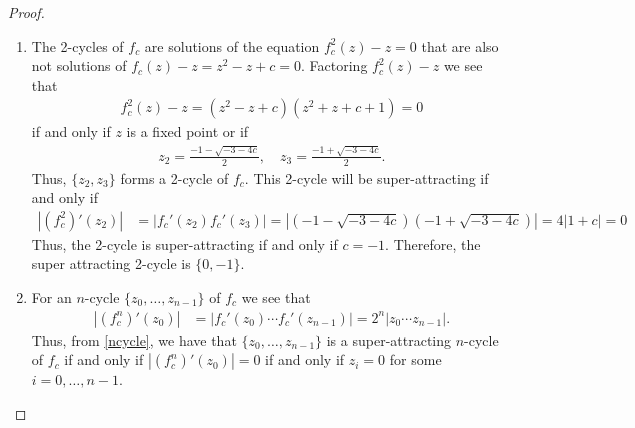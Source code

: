 \begin{proof}
\begin{enumerate}
    \item The 2-cycles of $f_c$ are solutions of the equation
      $f_c^2(z) - z =0$ that are also not solutions of $f_c(z) - z = z^2-z + c = 0$. Factoring $f_c^2(z) - z$
      we see that
      \begin{align*}
        f_c^2(z) - z = (z^2 -z + c)(z^2 + z + c + 1) = 0
      \end{align*}
      if and only if $z$ is a fixed point or if
      \begin{align*}
        z_2 = \frac{-1 - \sqrt{-3 - 4 c}}{2}, \quad        z_3 = \frac{-1 + \sqrt{-3 - 4 c}}{2}.
      \end{align*}
      Thus, $\{z_2, z_3\}$ forms a 2-cycle of $f_c$. This 2-cycle will be super-attracting
      if and only if
      \begin{align*}
        \left|(f_c^2)'(z_2)\right| &= \left|f_c'(z_2)f_c'(z_3)\right| = |\left(-1 - \sqrt{-3 - 4 c}\right)\left(-1 + \sqrt{-3 - 4 c}\right)| = 4|1 + c| = 0
      \end{align*}
      Thus, the 2-cycle is super-attracting if and only if $c = -1$. Therefore, the super attracting
      2-cycle is $\{0,-1\}$.

    \item For an $n$-cycle $\{z_0, \dots, z_{n-1}\}$ of $f_c$ we see that
      \begin{align}\label{ncycle}
        \left|(f_c^n)'(z_0)\right| &= \left|f_c'(z_0)\cdots f_c'(z_{n-1})\right| =2^n \left|z_0 \cdots z_{n-1}\right|.
      \end{align}
      Thus, from \eqref{ncycle}, we have that
      $\{z_0, \dots, z_{n-1}\}$ is a super-attracting $n$-cycle of $f_c$ if and only if
      $\left|(f_c^n)'(z_0)\right| = 0$
      if and only if $z_i = 0$ for some $i=0,\dots,n-1$.


\end{enumerate}
\end{proof}
